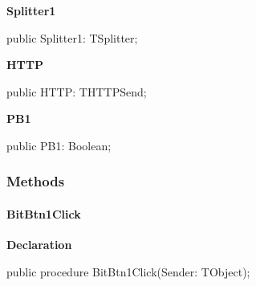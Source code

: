 \documentclass{report}
\newif\ifpdf
\begin{document}
\begin{list}{}
\begin{flushleft}
\ifpdf
\end{flushleft}
\fi


\par  \label{swcatalog.TSCForm-Splitter1}
\item[\textbf{Splitter1}\hfill]
\ifpdf
\begin{flushleft}
\fi
\begin{ttfamily}
public Splitter1: TSplitter;\end{ttfamily}

\ifpdf
\end{flushleft}
\fi


\par  \label{swcatalog.TSCForm-HTTP}
\item[\textbf{HTTP}\hfill]
\ifpdf
\begin{flushleft}
\fi
\begin{ttfamily}
public HTTP: THTTPSend;\end{ttfamily}

\ifpdf
\end{flushleft}
\fi


\par  \label{swcatalog.TSCForm-PB1}
\item[\textbf{PB1}\hfill]
\ifpdf
\begin{flushleft}
\fi
\begin{ttfamily}
public PB1: Boolean;\end{ttfamily}

\ifpdf
\end{flushleft}
\fi


\par  \end{list}
\subsubsection*{\large{\textbf{Methods}}\normalsize\hspace{1ex}\hfill}
\paragraph*{BitBtn1Click}\hspace*{\fill}

\label{swcatalog.TSCForm-BitBtn1Click}
\begin{list}{}{
\setlength{\itemindent}{0cm}
\setlength{\listparindent}{0cm}
\setlength{\leftmargin}{\evensidemargin}
\addtolength{\leftmargin}{\tmplength}
\settowidth{\labelsep}{X}
\addtolength{\leftmargin}{\labelsep}
\setlength{\labelwidth}{\tmplength}
}
\item[\textbf{Declaration}\hfill]
\ifpdf
\begin{flushleft}
\fi
\begin{ttfamily}
public procedure BitBtn1Click(Sender: TObject);\end{ttfamily}

\ifpdf
\end{flushleft}
\fi

\end{list}
\end{document}
